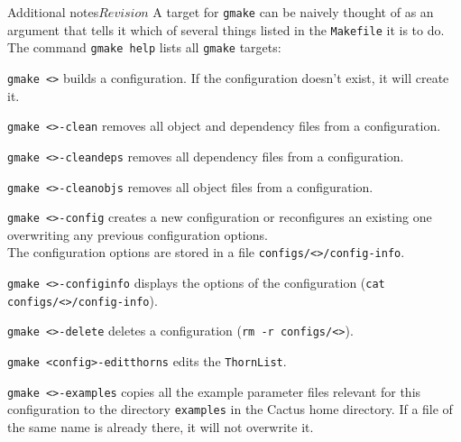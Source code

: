 \begin{cactuspart}{Additional notes}{}{$Revision$}
A target for \texttt{gmake} can be naively thought of as an argument
that tells it which of several things listed in the \texttt{Makefile} it
is to do. The command \texttt{gmake help} lists all \texttt{gmake} targets:

\begin{Lentry}

\item [\texttt{gmake <\var{config}>}]
        builds a configuration. If the configuration doesn't exist,
        it will create it.

\item [\texttt{gmake <\var{config}>-clean}] removes all object and dependency
files from a configuration.

\item [\texttt{gmake <\var{config}>-cleandeps}] removes all dependency files
from a configuration.

\item [\texttt{gmake <\var{config}>-cleanobjs}] removes all object files from
  a configuration.

\item [\texttt{gmake <\var{config}>-config}] creates a new configuration or
reconfigures an existing one overwriting any previous configuration options.\\
The configuration options are stored in a file
\texttt{configs/<>/config-info}.

\item [\texttt{gmake <\var{config}>-configinfo}] displays the options
of the configuration (\texttt{cat configs/<>/config-info}).


\item [\texttt{gmake <\var{config}>-delete}] deletes a configuration
(\texttt{rm -r configs/<>}).

\item [\texttt{gmake <config>-editthorns}] edits the \texttt{ThornList}.

\item [\texttt{gmake <\var{config}>-examples}] copies all the example parameter files relevant for this configuration to the directory \texttt{examples} in the Cactus home directory. If a file of the same name is already there, it will not overwrite it.


\end{Lentry}
\end{cactuspart}
